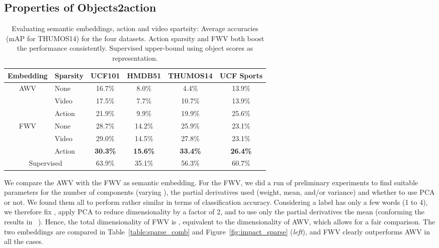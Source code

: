 \subsection{Properties of Objects2action}
\label{sec:params}


\begin{table*}[t]
\centering
{\small
\renewcommand{\tabcolsep}{3pt}
\begin{tabular}{| c | l | c | c | c | c | }
\hline
{\bf Embedding}		& {\bf Sparsity}  &    {\bf UCF101}   &   {\bf HMDB51}	&  {\bf THUMOS14} & {\bf UCF Sports}    \\      \hline
\multirow{3}{*}{AWV}		& None		&    16.7\% 	        &      8.0\%        &    4.4\%        & 13.9\%       \\	 	
					& Video		&    17.5\%        	&      7.7\%        &   10.7\%        & 13.9\%       \\
					& Action		&    21.9\%        	&      9.9\%        &   19.9\%        & 25.6\%       \\	\hline						
\multirow{3}{*}{FWV}	   	& None		&    28.7\%  	    	&     14.2\%        &    25.9\%        & 23.1\%       \\			
                    			& Video		&    29.0\%         	&     14.5\%        &   27.8\%        & 23.1\%       \\
					& Action		&   {\bf 30.3\%}    	&   {\bf 15.6\%}    & {\bf 33.4\%}    & {\bf 26.4\%}  \\    \hline \hline
\multicolumn{2}{|c|}{{Supervised}} &   63.9\%    &  35.1\%   	& 56.3\%		&  60.7\%	\\	\hline		
\end{tabular}}
\caption{{Evaluating semantic embeddings, action and video spartsity: Average accuracies (mAP for THUMOS14) for the four datasets. Action sparsity and FWV both boost the performance consistently. Supervised upper-bound using object scores as representation.}}
\label{table:cls_comp}
\end{table*}

We compare the AWV with the FWV as semantic embedding.
For the FWV, we did a run of preliminary experiments to find suitable parameters for the number of components (varying ), the partial derivatives used (weight, mean, and/or variance)  and whether to use PCA or not.
We found them all to perform rather similar in terms of classification accuracy. 
Considering a label has only a few words (1 to 4), we therefore fix , apply PCA to reduce dimensionality by a factor of 2, and to use only the partial derivatives \wrt the mean (conforming the results in ~\cite{clinchant13ictir}).
Hence, the total dimensionality of FWV is , equivalent to the dimensionality of AWV, which allows for a fair comparison.
The two embeddings are compared in Table~\ref{table:sparse_comb} and Figure~\ref{fig:impact_sparse} (\emph{left}), and  FWV clearly outperforms AWV in all the cases.


